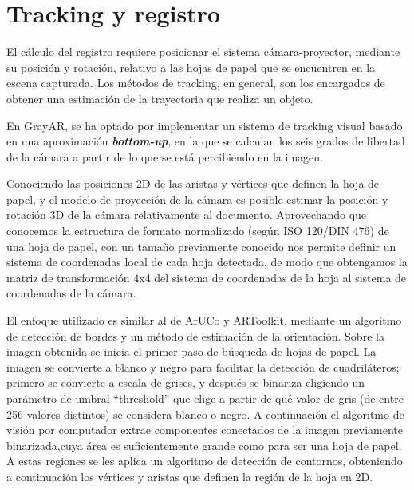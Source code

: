 \section{Tracking y registro}
El cálculo del registro requiere posicionar el sistema cámara-proyector, mediante su posición y
rotación, relativo a las hojas de papel que se encuentren en la escena capturada. Los métodos de
tracking, en general, son los encargados de obtener una estimación de la trayectoria que realiza un
objeto.

En GrayAR, se ha optado por implementar un sistema de tracking visual basado en una aproximación \textbf{\textit{bottom-up}}\cite{Marimon}, en la que se calculan los seis grados de libertad de la cámara a partir de lo que se está
percibiendo en la imagen.




Conociendo las posiciones 2D de las aristas y vértices que definen la hoja de papel, y el modelo de
proyección de la cámara es posible estimar la posición y rotación 3D de la cámara relativamente al
documento. Aprovechando que conocemos la estructura de formato normalizado (según ISO 120/DIN 476) de una
hoja de papel, con un tamaño previamente conocido nos permite definir un sistema de coordenadas
local de cada hoja detectada, de modo que obtengamos la matriz de transformación 4x4 del sistema de
coordenadas de la hoja al sistema de coordenadas de la cámara.

El enfoque utilizado es similar al de ArUCo y ARToolkit, mediante un algoritmo de detección de bordes y un
método de estimación de la orientación. Sobre la imagen obtenida se inicia el primer paso de búsqueda de hojas de
papel. La imagen se convierte a blanco y negro para facilitar la detección de cuadriláteros;
primero se convierte a escala de grises, y después se binariza eligiendo un parámetro de
umbral “threshold” que elige a partir de qué valor de gris (de entre 256 valores distintos) se
considera blanco o negro. A continuación el algoritmo de visión por computador
extrae componentes conectados de la imagen previamente binarizada,cuya área es
suficientemente grande como para ser una hoja de papel. A estas regiones se les aplica un algoritmo
de detección de contornos, obteniendo a continuación los vértices y aristas que definen la
región de la hoja en 2D.

